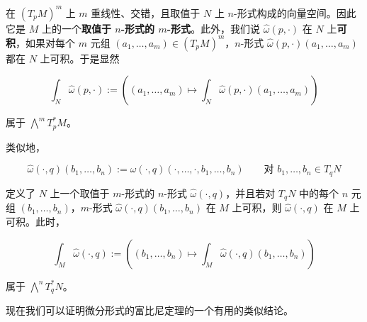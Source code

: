 在 $ (T_p M)^m $ 上 $ m $ 重线性、交错，且取值于 $ N $ 上 $ n $-形式构成的向量空间。因此它是 $ M $ 上的一个\textbf{取值于 $ n $-形式的 $ m $-形式}。此外，我们说 $ \widehat{\omega}(p,\cdot) $ 在 $ N $ 上\textbf{可积}，如果对每个 $ m $ 元组 $ (a_1, \dots, a_m) \in (T_p M)^m $，$ n $-形式 $ \widehat{\omega}(p,\cdot)(a_1, \dots, a_m) $ 都在 $ N $ 上可积。于是显然

\[
\int_N \widehat{\omega}(p,\cdot) := \left( (a_1, \dots, a_m) \mapsto \int_N \widehat{\omega}(p,\cdot)(a_1, \dots, a_m) \right)
\]

属于 $ \bigwedge^m T_p^* M $。

类似地，

\[
\widehat{\omega}(\cdot,q)(b_1, \dots, b_n) := \omega(\cdot,q)(\cdot, \dots, \cdot, b_1, \dots, b_n) \qquad \text{对 } b_1, \dots, b_n \in T_q N
\]

定义了 $ N $ 上一个取值于 $ m $-形式的 $ n $-形式 $ \widehat{\omega}(\cdot,q) $，并且若对 $ T_q N $ 中的每个 $ n $ 元组 $ (b_1, \dots, b_n) $，$ m $-形式 $ \widehat{\omega}(\cdot,q)(b_1, \dots, b_n) $ 在 $ M $ 上可积，则 $ \widehat{\omega}(\cdot,q) $ 在 $ M $ 上可积。此时，

\[
\int_M \widehat{\omega}(\cdot,q) := \left( (b_1, \dots, b_n) \mapsto \int_M \widehat{\omega}(\cdot,q)(b_1, \dots, b_n) \right)
\]

属于 $ \bigwedge^n T_q^* N $。

现在我们可以证明微分形式的富比尼定理的一个有用的类似结论。

